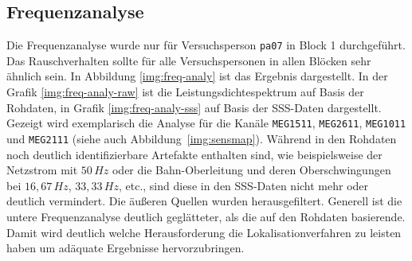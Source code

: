 \documentclass[doc,a4paper,12pt]{apa6}
\begin{document}
\subsection{Frequenzanalyse}
\label{sec:freq-analy}

Die Frequenzanalyse wurde nur für Versuchsperson \texttt{pa07} in Block 1 durchgeführt. Das Rauschverhalten sollte für alle Versuchspersonen in allen Blöcken sehr ähnlich sein. In Abbildung \ref{img:freq-analy} ist das Ergebnis dargestellt. In der Grafik \ref{img:freq-analy-raw} ist die Leistungsdichtespektrum auf Basis der Rohdaten, in Grafik \ref{img:freq-analy-sss} auf Basis der SSS-Daten dargestellt. Gezeigt wird exemplarisch die Analyse für die Kanäle \texttt{MEG1511}, \texttt{MEG2611}, \texttt{MEG1011} und \texttt{MEG2111} (siehe auch Abbildung~\ref{img:sensmap}). Während in den Rohdaten noch deutlich identifizierbare Artefakte enthalten sind, wie beispielsweise der Netzstrom mit $50\,Hz$ oder die Bahn-Oberleitung und deren Oberschwingungen bei $16,67\,Hz$, $33,33\,Hz$, etc., sind diese in den SSS-Daten nicht mehr oder deutlich vermindert. Die äußeren Quellen wurden herausgefiltert. Generell ist die untere Frequenzanalyse deutlich geglätteter, als die auf den Rohdaten basierende. Damit wird deutlich welche Herausforderung die Lokalisationverfahren zu leisten haben um adäquate Ergebnisse hervorzubringen.
\end{document}

